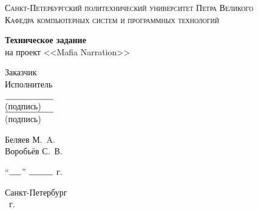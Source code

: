 \begin{titlepage}
    \centering
    \begingroup
    \large
    \textsc{Санкт-Петербургский политехнический университет Петра Великого}\\[3mm]
    \textsc{Кафедра компьютерных систем и программных технологий}\\[55mm]
	\endgroup
    
	\vfill
	
    \begingroup
    \LARGE
	\textbf{Техническое задание}\\[3mm]
	на проект <<Mafia Narration>>\\
	\endgroup
	
	\vfill
	
    \large
    \begin{flushright}
	\begin{minipage}{.55\linewidth}
        \begin{multicols*}{3}
        	Заказчик\\
        	
        	Исполнитель\\
        	
        	\columnbreak
        
            \begingroup
            \centering
        	\footnotesize
        	$\rule{20mm}{0.15mm}$\\
        	(подпись)\\
        	$\rule{20mm}{0.15mm}$\\
        	(подпись)\\
        	\endgroup
        	
        	\columnbreak

        	Беляев М.~A.\\
        	
        	Воробьёв С.~В.
        \end{multicols*}
        \begin{flushright}
        	``$\rule{5mm}{0.15mm}$'' $\rule{10mm}{0.15mm}$ \the\year г.
        \end{flushright}
	\end{minipage}
    \end{flushright}
	
	\vfill
	
	Санкт-Петербург\\
	\the\year\ г.
\end{titlepage}
